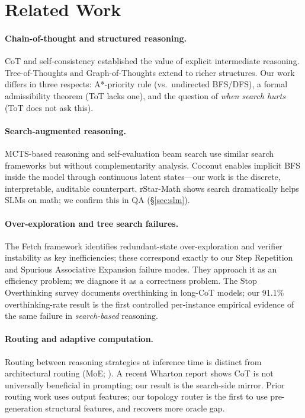 \documentclass[11pt]{article}
\begin{document}
\section{Related Work}
\label{sec:related}

\paragraph{Chain-of-thought and structured reasoning.}
CoT \citep{wei2022chain} and self-consistency \citep{wang2023self} established the value of explicit intermediate reasoning. Tree-of-Thoughts \citep{yao2024tree} and Graph-of-Thoughts \citep{besta2024graph} extend to richer structures. Our work differs in three respects: A*-priority rule (vs.\ undirected BFS/DFS), a formal admissibility theorem (ToT lacks one), and the question of \emph{when search hurts} (ToT does not ask this).

\paragraph{Search-augmented reasoning.}
MCTS-based reasoning \citep{hao2023reasoning} and self-evaluation beam search \citep{xie2024self} use similar search frameworks but without complementarity analysis. Coconut \citep{hao2024coconut} enables implicit BFS inside the model through continuous latent states—our work is the discrete, interpretable, auditable counterpart. rStar-Math \citep{guan2025rstar} shows search dramatically helps SLMs on math; we confirm this in QA (\S\ref{sec:slm}).

\paragraph{Over-exploration and tree search failures.}
The Fetch framework \citep{zhang2025fetch} identifies redundant-state over-exploration and verifier instability as key inefficiencies; these correspond exactly to our Step Repetition and Spurious Associative Expansion failure modes. They approach it as an efficiency problem; we diagnose it as a correctness problem. The Stop Overthinking survey \citep{zhang2025overthinking} documents overthinking in long-CoT models; our 91.1\% overthinking-rate result is the first controlled per-instance empirical evidence of the same failure in \emph{search-based} reasoning.

\paragraph{Routing and adaptive computation.}
Routing between reasoning strategies at inference time is distinct from architectural routing (MoE; \citealt{shazeer2017outrageously}). A recent Wharton report \citep{meincke2025decreasing} shows CoT is not universally beneficial in prompting; our result is the search-side mirror. Prior routing work uses output features; our topology router is the first to use pre-generation structural features, and recovers more oracle gap.
\end{document}
